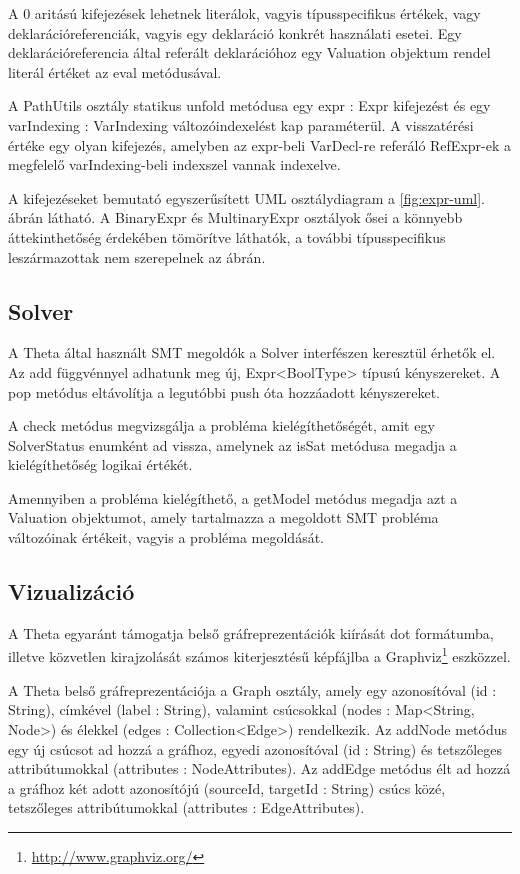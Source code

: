 A 0 aritású kifejezések lehetnek literálok, vagyis típusspecifikus értékek, vagy deklarációreferenciák, vagyis egy deklaráció konkrét használati esetei. Egy deklarációreferencia által referált deklarációhoz egy \textsf{Valuation} objektum rendel literál értéket az \textsf{eval} metódusával.

A \textsf{PathUtils} osztály statikus \textsf{unfold} metódusa egy \textsf{expr : Expr} kifejezést és egy \textsf{varIndexing : VarIndexing} változóindexelést kap paraméterül. A visszatérési értéke egy olyan kifejezés, amelyben az \textsf{expr}-beli \textsf{VarDecl}-re referáló \textsf{RefExpr}-ek a megfelelő \textsf{varIndexing}-beli indexszel vannak indexelve.

A kifejezéseket bemutató egyszerűsített UML osztálydiagram a \ref{fig:expr-uml}. ábrán látható. A \textsf{BinaryExpr} és \textsf{MultinaryExpr} osztályok ősei a könnyebb áttekinthetőség érdekében tömörítve láthatók, a további típusspecifikus leszármazottak nem szerepelnek az ábrán.

\subsection{Solver}
A Theta által használt SMT megoldók a \textsf{Solver} interfészen keresztül érhetők el. Az \textsf{add} függvénnyel adhatunk meg új, \textsf{Expr<BoolType>} típusú kényszereket. A \textsf{pop} metódus eltávolítja a legutóbbi \textsf{push} óta hozzáadott kényszereket.

A \textsf{check} metódus megvizsgálja a probléma kielégíthetőségét, amit egy \textsf{SolverStatus} enumként ad vissza, amelynek az \textsf{isSat} metódusa megadja a kielégíthetőség logikai értékét.

Amennyiben a probléma kielégíthető, a \textsf{getModel} metódus megadja azt a \textsf{Valuation} objektumot, amely tartalmazza a megoldott SMT probléma változóinak értékeit, vagyis a probléma megoldását.

\subsection{Vizualizáció}
A Theta egyaránt támogatja belső gráfreprezentációk kiírását dot formátumba, illetve közvetlen kirajzolását számos kiterjesztésű képfájlba a Graphviz\footnote{\url{http://www.graphviz.org/}} eszközzel.

A Theta belső gráfreprezentációja a \textsf{Graph} osztály, amely egy azonosítóval (\textsf{id : String}), címkével (\textsf{label : String}), valamint csúcsokkal (\textsf{nodes : Map<String, Node>}) és élekkel (\textsf{edges : Collection<Edge>}) rendelkezik. Az \textsf{addNode} metódus egy új csúcsot ad hozzá a gráfhoz, egyedi azonosítóval (\textsf{id : String}) és tetszőleges attribútumokkal (\textsf{attributes : NodeAttributes}). Az \textsf{addEdge} metódus élt ad hozzá a gráfhoz két adott azonosítójú (\textsf{sourceId, targetId : String}) csúcs közé, tetszőleges attribútumokkal (\textsf{attributes : EdgeAttributes}).

